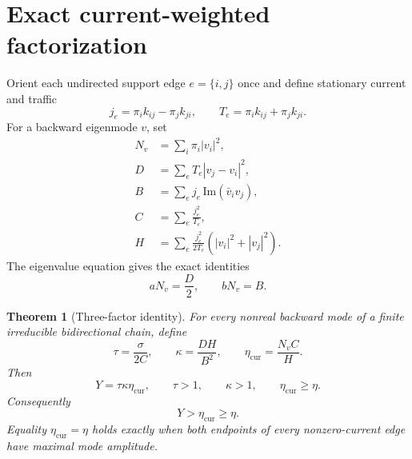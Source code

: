\documentclass[aps,pre,reprint,groupedaddress,nofootinbib,showkeys,floatfix]{revtex4-2}
\newtheorem{theorem}{Theorem}
\newcommand{\Nv}{N_v}
\newcommand{\ecur}{\eta_{\mathrm{cur}}}
\begin{document}
\section{Exact current-weighted factorization}
Orient each undirected support edge $e=\{i,j\}$ once and define stationary current and traffic
\begin{equation}
j_e=\pi_i k_{ij}-\pi_j k_{ji},\qquad T_e=\pi_i k_{ij}+\pi_j k_{ji}.
\end{equation}
For a backward eigenmode $v$, set
\begin{align}
\Nv&=\sum_i\pi_i|v_i|^2,\\
D&=\sum_eT_e|v_j-v_i|^2,\\
B&=\sum_ej_e\,\mathrm{Im}(\bar v_i v_j),\\
C&=\sum_e\frac{j_e^2}{T_e},\\
H&=\sum_e\frac{j_e^2}{2T_e}(|v_i|^2+|v_j|^2).
\end{align}
The eigenvalue equation gives the exact identities
\begin{equation}
a\Nv=\frac D2,\qquad b\Nv=B.
\end{equation}

\begin{theorem}[Three-factor identity]
For every nonreal backward mode of a finite irreducible bidirectional chain, define
\begin{equation}
\tau=\frac{\sigma}{2C},\qquad
\kappa=\frac{DH}{B^2},\qquad
\ecur=\frac{\Nv C}{H}.
\end{equation}
Then
\begin{equation}
\boxed{Y=\tau\kappa\ecur},\qquad
\boxed{\tau>1},\qquad
\boxed{\kappa>1},\qquad
\boxed{\ecur\ge\eta}.
\end{equation}
Consequently
\begin{equation}
\boxed{Y>\ecur\ge\eta}.
\end{equation}
Equality $\ecur=\eta$ holds exactly when both endpoints of every nonzero-current edge have maximal mode amplitude.
\end{theorem}
\end{document}
